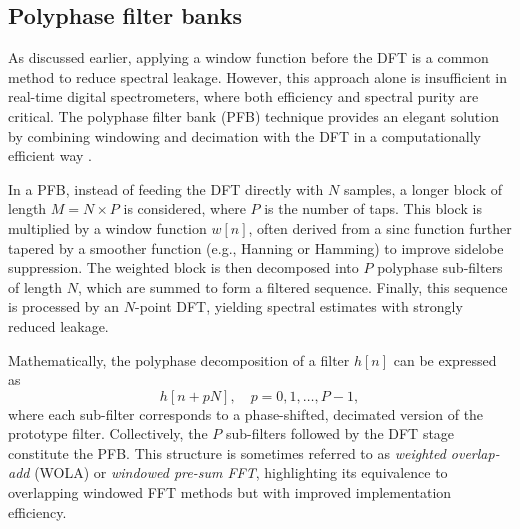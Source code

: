 

\subsection{Polyphase filter banks}
As discussed earlier, applying a window function before the DFT is a common method to reduce spectral leakage. However, this approach alone is insufficient in real-time digital spectrometers, where both efficiency and spectral purity are critical. The polyphase filter bank (PFB) technique provides an elegant solution by combining windowing and decimation with the DFT in a computationally efficient way \citep{Harris1978}.

In a PFB, instead of feeding the DFT directly with $N$ samples, a longer block of length $M = N \times P$ is considered, where $P$ is the number of taps. This block is multiplied by a window function $w[n]$, often derived from a sinc function further tapered by a smoother function (e.g., Hanning or Hamming) to improve sidelobe suppression. The weighted block is then decomposed into $P$ polyphase sub-filters of length $N$, which are summed to form a filtered sequence. Finally, this sequence is processed by an $N$-point DFT, yielding spectral estimates with strongly reduced leakage.

Mathematically, the polyphase decomposition of a filter $h[n]$ can be expressed as
\begin{equation}
    h[n + pN], \quad p = 0,1,\ldots,P-1,
\end{equation}
where each sub-filter corresponds to a phase-shifted, decimated version of the prototype filter. Collectively, the $P$ sub-filters followed by the DFT stage constitute the PFB. This structure is sometimes referred to as \textit{weighted overlap-add} (WOLA) or \textit{windowed pre-sum FFT}, highlighting its equivalence to overlapping windowed FFT methods but with improved implementation efficiency.

